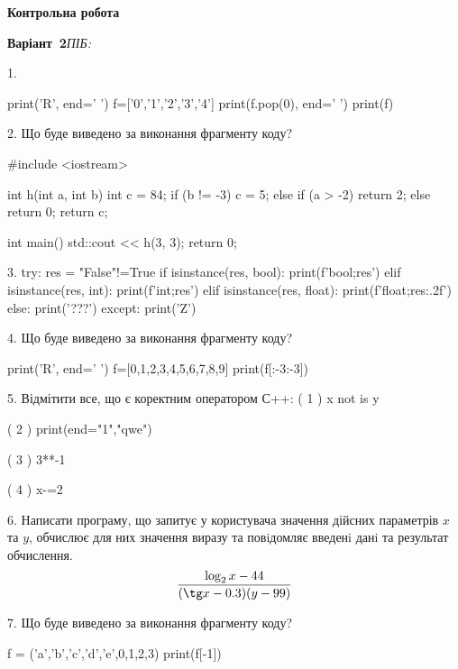 \documentclass[11pt]{article}
\begin{document}
{\large\textbf{Контрольна робота}}

\textbf{Варіант \No\,2}\hfill \textit{ПІБ:}\,\underline{\hspace{60mm}}
\vspace{4mm}

1. 

print('R', end=' ')
f=['0','1','2','3','4']
print(f.pop(0), end=' ')
print(f)



2. Що буде виведено за виконання фрагменту коду?

#include <iostream>

int h(int a, int b){
    int c = 84;
    if (b != -3)
        c = 5;
    else if (a > -2)
         return 2;
    else 
        return 0;
    return c;
}

int main(){
    std::cout << h(3, 3);
    return 0;
}


3. 
try:
    res = "False"!=True
    if isinstance(res, bool):
        print(f'bool;{res}')
    elif isinstance(res, int):
        print(f'int;{res}')
    elif isinstance(res, float):
        print(f'float;{res:.2f}')
    else:
        print('???')
except:
    print('Z')


4. Що буде виведено за виконання фрагменту коду?

print('R', end=' ')
f=[0,1,2,3,4,5,6,7,8,9]
print(f[:-3:-3])



5. %
Відмітити все, що є коректним оператором С++:
( 1 ) x not is y

( 2 ) print(end="1","qwe")

( 3 ) 3**-1

( 4 ) x-=2


6. 
Написати програму, що запитує у користувача значення дійсних параметрів $x$ та $y$, обчислює для них значення виразу та повiдомляє введенi данi та результат обчислення.
$$\frac{\log_{2} x - 44}{(\tg x - 0.3) (y - 99)}$$ 



7. Що буде виведено за виконання фрагменту коду?

f = ('a','b','c','d','e',0,1,2,3)
print(f[-1])


\end{document}
